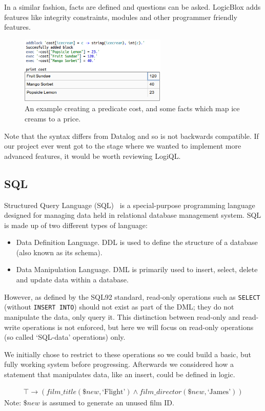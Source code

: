\documentclass[a4paper, 11pt]{article}
\begin{document}
  In a similar fashion, facts are defined and questions can be asked. LogicBlox adds features like integrity constraints, modules and other programmer friendly features.

  \begin{figure}[h!]
    \centering
    \includegraphics[width=7cm]{images/logicblox.png}
    \caption{An example creating a predicate cost, and some facts which map ice creams to a price.}
  \end{figure}

  Note that the syntax differs from Datalog and so is not backwards compatible. If our project ever went got to the stage where we wanted to implement more advanced features, it would be worth reviewing LogiQL.
  
  \subsection{SQL}
    Structured Query Language (SQL)~\cite{wiki:SQL} is a special-purpose
    programming language designed for managing data held in relational database
    management system. SQL is made up of two different types of language:

    \begin{itemize}
      \item
        Data Definition Language. DDL is used to define the structure of a
        database (also known as its schema).
      \item
        Data Manipulation Language. DML is primarily used to insert, select,
        delete and update data within a database.
    \end{itemize}

    However, as defined by the SQL92 standard\cite{isoSQL}, read-only operations
    such as \texttt{SELECT} (without \texttt{INSERT INTO}) should not exist as
    part of the DML; they do not manipulate the data, only query it. This
    distinction between read-only and read-write operations is not enforced, but
    here we will focus on read-only operations (so called `SQL-data' operations)
    only.

    We initially chose to restrict to these operations so we could build a basic,
    but fully working system before progressing. Afterwards we considered how
    a statement that manipulates data, like an insert, could be defined in logic.
    \begin{center}
      \begin{gather}
        \top \rightarrow (film\_title(\$new, \text{`Flight'}) \land
          film\_director(\$new, \text{`James'}))
      \end{gather}
      Note: $\$new$ is assumed to generate an unused film ID.
    \end{center}
\end{document}
